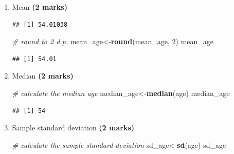 \documentclass[
]{article}
\newenvironment{Shaded}{\begin{snugshade}}{\end{snugshade}}
\newcommand{\CommentTok}[1]{\textcolor[rgb]{0.56,0.35,0.01}{\textit{#1}}}
\newcommand{\DecValTok}[1]{\textcolor[rgb]{0.00,0.00,0.81}{#1}}
\newcommand{\FunctionTok}[1]{\textcolor[rgb]{0.13,0.29,0.53}{\textbf{#1}}}
\newcommand{\NormalTok}[1]{#1}
\newcommand{\OtherTok}[1]{\textcolor[rgb]{0.56,0.35,0.01}{#1}}
\newcommand{\SpecialCharTok}[1]{\textcolor[rgb]{0.81,0.36,0.00}{\textbf{#1}}}
\begin{document}
\begin{enumerate}
\def\labelenumi{\alph{enumi})}
\item
  Mean \textbf{(2 marks)}

\begin{Shaded}
\end{Shaded}

\begin{verbatim}
## [1] 54.01038
\end{verbatim}

\begin{Shaded}
\begin{Highlighting}[]
\CommentTok{\# round to 2 d.p.}
\NormalTok{mean\_age}\OtherTok{\textless{}{-}}\FunctionTok{round}\NormalTok{(mean\_age, }\DecValTok{2}\NormalTok{)}
\NormalTok{mean\_age}
\end{Highlighting}
\end{Shaded}

\begin{verbatim}
## [1] 54.01
\end{verbatim}
\item
  Median \textbf{(2 marks)}

\begin{Shaded}
\begin{Highlighting}[]
\CommentTok{\# calculate the median age}
\NormalTok{median\_age}\OtherTok{\textless{}{-}}\FunctionTok{median}\NormalTok{(age)}
\NormalTok{median\_age}
\end{Highlighting}
\end{Shaded}

\begin{verbatim}
## [1] 54
\end{verbatim}
\item
  Sample standard deviation \textbf{(2 marks)}

\begin{Shaded}
\begin{Highlighting}[]
\CommentTok{\# calculate the sample standard deviation}
\NormalTok{sd\_age}\OtherTok{\textless{}{-}}\FunctionTok{sd}\NormalTok{(age)}
\NormalTok{sd\_age}
\end{Highlighting}
\end{Shaded}


\end{enumerate}
\end{document}
